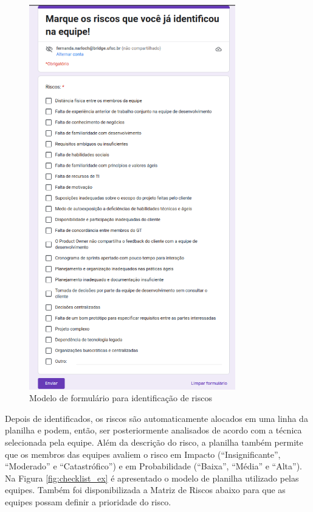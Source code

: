 \documentclass[
    12pt,       %
    openright,      %
    twoside,      %
    a4paper,      %
    english,      %
    french,       %
    spanish,      %
    brazil,       %
    ]{abntex2}
\begin{document}
\begin{figure}
    \centering
    \includegraphics[width=0.8\textwidth]{src/tex/img/modelo-formulario.png}
    \caption{Modelo de formulário para identificação de riscos}
    \label{fig:form_model}
\end{figure}

Depois de identificados, os riscos são automaticamente alocados em uma linha da planilha e podem, então, ser posteriormente analisados de acordo com a técnica selecionada pela equipe. Além da descrição do risco, a planilha também permite que os membros das equipes avaliem o risco em Impacto (``Insignificante'', ``Moderado'' e ``Catastrófico'') e em Probabilidade (``Baixa'', ``Média'' e ``Alta''). Na Figura \ref{fig:checklist_ex} é apresentado o modelo de planilha utilizado pelas equipes. Também foi disponibilizada a Matriz de Riscos abaixo para que as equipes possam definir a prioridade do risco. 
\end{document}
